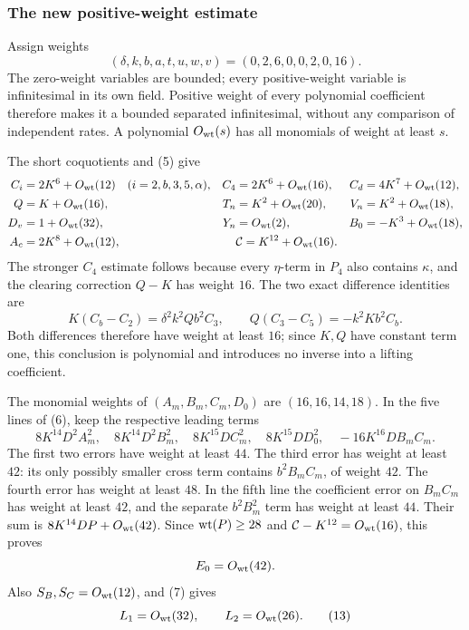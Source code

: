 \subsubsection*{The new positive-weight estimate}

Assign weights
\begin{equation}
 (\delta,k,b,a,t,u,w,v)=(0,2,6,0,0,2,0,16).             \tag{12}
\end{equation}
The zero-weight variables are bounded; every positive-weight variable
is infinitesimal in its own field. Positive weight of every polynomial
coefficient therefore makes it a bounded separated infinitesimal,
without any comparison of independent rates. A polynomial
$O_{\mathrm{wt}}(s)$ has all monomials of weight at least $s$.

The short coquotients and (5) give
\begin{align*}
 C_i&=2K^6+O_{\mathrm{wt}}(12)\quad(i=2,b,3,5,\alpha),&
 C_4&=2K^6+O_{\mathrm{wt}}(16),& C_d&=4K^7+O_{\mathrm{wt}}(12),\\
 Q&=K+O_{\mathrm{wt}}(16),& T_n&=K^2+O_{\mathrm{wt}}(20),& V_n&=K^2+O_{\mathrm{wt}}(18),\\
 D_v&=1+O_{\mathrm{wt}}(32),&Y_n&=O_{\mathrm{wt}}(2),&B_0&=-K^3+O_{\mathrm{wt}}(18),\\
 A_c&=2K^8+O_{\mathrm{wt}}(12),&&\mathcal C=K^{12}+O_{\mathrm{wt}}(16).
\end{align*}
The stronger $C_4$ estimate follows because every $\eta$-term in
$P_4$ also contains $\kappa$, and the clearing correction $Q-K$
has weight $16$. The two exact difference identities are
\[
 K(C_b-C_2)=\delta^2k^2Qb^2C_3,\qquad
 Q(C_3-C_5)=-k^2Kb^2C_b.
\]
Both differences therefore have weight at least $16$; since $K,Q$
have constant term one, this conclusion is polynomial and introduces
no inverse into a lifting coefficient.

The monomial weights of $(A_m,B_m,C_m,D_0)$ are $(16,16,14,18)$.
In the five lines of (6), keep the respective leading terms
\[
 8K^{14}D^2A_m^2,\quad 8K^{14}D^2B_m^2,\quad
 8K^{15}DC_m^2,\quad 8K^{15}DD_0^2,\quad
 -16K^{16}DB_mC_m.
\]
The first two errors have weight at least $44$. The third error has
weight at least $42$: its only possibly smaller cross term contains
$b^2B_mC_m$, of weight $42$. The fourth error has weight at least
$48$. In the fifth line the coefficient error on $B_mC_m$ has weight
at least $42$, and the separate $b^2B_m^2$ term has weight at least
$44$. Their sum is $8K^{14}DP+O_{\mathrm{wt}}(42)$. Since $\operatorname{wt}(P)\geq28$
and $\mathcal C-K^{12}=O_{\mathrm{wt}}(16)$, this proves
\[
 E_0=O_{\mathrm{wt}}(42).
\]
Also $S_B,S_C=O_{\mathrm{wt}}(12)$, and (7) gives
\begin{equation}
 L_1=O_{\mathrm{wt}}(32),\qquad L_2=O_{\mathrm{wt}}(26).                       \tag{13}
\end{equation}

